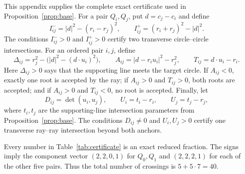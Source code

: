 \documentclass[11pt]{article}
\theoremstyle{plain}
\theoremstyle{definition}
\theoremstyle{remark}
\newcommand{\1}{\mathbf 1}
\begin{document}
This appendix supplies the complete exact certificate used in
Proposition~\ref{prop:base}.  For a pair $Q_i,Q_j$, put $d=c_j-c_i$ and define
\[
 I^-_{ij}=|d|^2-(r_i-r_j)^2,
 \qquad
 I^+_{ij}=(r_i+r_j)^2-|d|^2.
\]
The conditions $I^-_{ij}>0$ and $I^+_{ij}>0$ certify two transverse
circle--circle intersections.  For an ordered pair $i,j$, define
\[
 \Delta_{ij}=r_j^2-\bigl(|d|^2-(d\cdot u_i)^2\bigr),\qquad
 A_{ij}=|d-r_i u_i|^2-r_j^2,\qquad
 T_{ij}=d\cdot u_i-r_i.
\]
Here $\Delta_{ij}>0$ says that the supporting line meets the target circle.
If $A_{ij}<0$, exactly one root is accepted by the ray; if $A_{ij}>0$ and
$T_{ij}>0$, both roots are accepted; and if $A_{ij}>0$ and $T_{ij}<0$, no
root is accepted.  Finally, let
\[
 D_{ij}=\det(u_i,u_j),\qquad
 U_i=t_i-r_i,\qquad U_j=t_j-r_j,
\]
where $t_i,t_j$ are the supporting-line intersection parameters from
Proposition~\ref{prop:base}.  The conditions $D_{ij}\ne0$ and $U_i,U_j>0$
certify one transverse ray--ray intersection beyond both anchors.

Every number in Table~\ref{tab:certificate} is an exact reduced fraction.
The signs imply the component vector $(2,2,0,1)$ for $Q_0,Q_1$ and
$(2,2,2,1)$ for each of the other five pairs.  Thus the total number of
crossings is $5+5\cdot7=40$.
\end{document}
